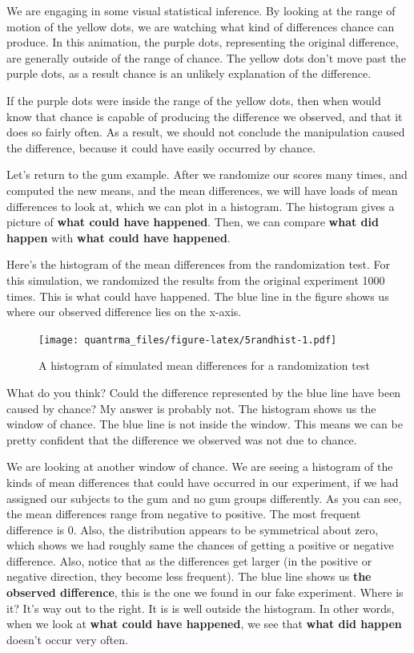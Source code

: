 \documentclass[
]{book}
\begin{document}
We are engaging in some visual statistical inference. By looking at the range of motion of the yellow dots, we are watching what kind of differences chance can produce. In this animation, the purple dots, representing the original difference, are generally outside of the range of chance. The yellow dots don't move past the purple dots, as a result chance is an unlikely explanation of the difference.

If the purple dots were inside the range of the yellow dots, then when would know that chance is capable of producing the difference we observed, and that it does so fairly often. As a result, we should not conclude the manipulation caused the difference, because it could have easily occurred by chance.

Let's return to the gum example. After we randomize our scores many times, and computed the new means, and the mean differences, we will have loads of mean differences to look at, which we can plot in a histogram. The histogram gives a picture of \textbf{what could have happened}. Then, we can compare \textbf{what did happen} with \textbf{what could have happened}.

Here's the histogram of the mean differences from the randomization test. For this simulation, we randomized the results from the original experiment 1000 times. This is what could have happened. The blue line in the figure shows us where our observed difference lies on the x-axis.

\begin{figure}
\centering
\texttt{[image: quantrma\_files/figure-latex/5randhist-1.pdf]}
\caption{\label{fig:5randhist}A histogram of simulated mean differences for a randomization test}
\end{figure}

What do you think? Could the difference represented by the blue line have been caused by chance? My answer is probably not. The histogram shows us the window of chance. The blue line is not inside the window. This means we can be pretty confident that the difference we observed was not due to chance.

We are looking at another window of chance. We are seeing a histogram of the kinds of mean differences that could have occurred in our experiment, if we had assigned our subjects to the gum and no gum groups differently. As you can see, the mean differences range from negative to positive. The most frequent difference is 0. Also, the distribution appears to be symmetrical about zero, which shows we had roughly same the chances of getting a positive or negative difference. Also, notice that as the differences get larger (in the positive or negative direction, they become less frequent). The blue line shows us \textbf{the observed difference}, this is the one we found in our fake experiment. Where is it? It's way out to the right. It is is well outside the histogram. In other words, when we look at \textbf{what could have happened}, we see that \textbf{what did happen} doesn't occur very often.
\end{document}
